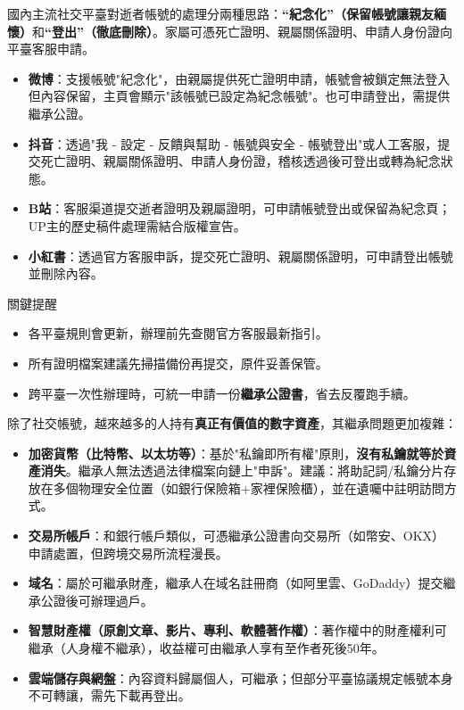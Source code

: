 
國內主流社交平臺對逝者帳號的處理分兩種思路：\textbf{“紀念化”（保留帳號讓親友緬懷）}和\textbf{“登出”（徹底刪除）}。家屬可憑死亡證明、親屬關係證明、申請人身份證向平臺客服申請。

\begin{itemize}
  \item \textbf{微博}：支援帳號"紀念化"，由親屬提供死亡證明申請，帳號會被鎖定無法登入但內容保留，主頁會顯示"該帳號已設定為紀念帳號"。也可申請登出，需提供繼承公證。
  \item \textbf{抖音}：透過"我 - 設定 - 反饋與幫助 - 帳號與安全 - 帳號登出"或人工客服，提交死亡證明、親屬關係證明、申請人身份證，稽核透過後可登出或轉為紀念狀態。
  \item \textbf{B站}：客服渠道提交逝者證明及親屬證明，可申請帳號登出或保留為紀念頁；UP主的歷史稿件處理需結合版權宣告。
  \item \textbf{小紅書}：透過官方客服申訴，提交死亡證明、親屬關係證明，可申請登出帳號並刪除內容。
\end{itemize}

\begin{tcbinfo}{關鍵提醒}
\begin{itemize}
  \item 各平臺規則會更新，辦理前先查閱官方客服最新指引。
  \item 所有證明檔案建議先掃描備份再提交，原件妥善保管。
  \item 跨平臺一次性辦理時，可統一申請一份\textbf{繼承公證書}，省去反覆跑手續。
\end{itemize}

\end{tcbinfo}


除了社交帳號，越來越多的人持有\textbf{真正有價值的數字資產}，其繼承問題更加複雜：

\begin{itemize}
  \item \textbf{加密貨幣（比特幣、以太坊等）}：基於"私鑰即所有權"原則，\textbf{沒有私鑰就等於資產消失}。繼承人無法透過法律檔案向鏈上"申訴"。建議：將助記詞/私鑰分片存放在多個物理安全位置（如銀行保險箱+家裡保險櫃），並在遺囑中註明訪問方式。
  \item \textbf{交易所帳戶}：和銀行帳戶類似，可憑繼承公證書向交易所（如幣安、OKX）申請處置，但跨境交易所流程漫長。
  \item \textbf{域名}：屬於可繼承財產，繼承人在域名註冊商（如阿里雲、GoDaddy）提交繼承公證後可辦理過戶。
  \item \textbf{智慧財產權（原創文章、影片、專利、軟體著作權）}：著作權中的財產權利可繼承（人身權不繼承），收益權可由繼承人享有至作者死後50年。
  \item \textbf{雲端儲存與網盤}：內容資料歸屬個人，可繼承；但部分平臺協議規定帳號本身不可轉讓，需先下載再登出。
\end{itemize}

